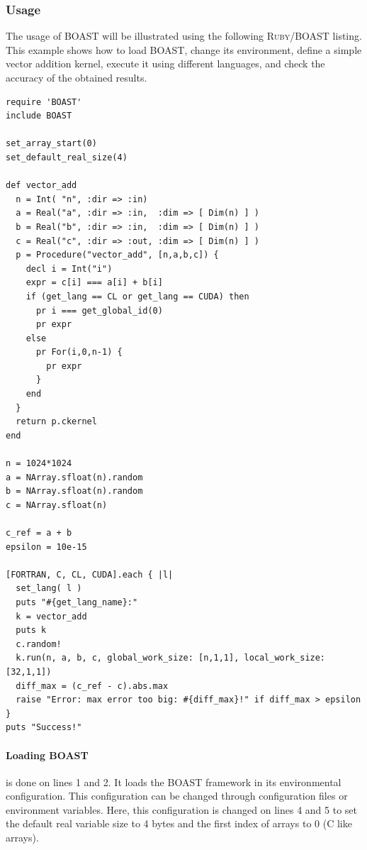 \documentclass[11pt, a4paper, twoside]{montblanc2}
\def\ruby{\textsc{Ruby}\xspace}
\begin{document}
\subsubsection{Usage}


The usage of BOAST will be illustrated using the following \ruby/BOAST listing.
This example shows how to load BOAST, change its environment, define a simple vector addition kernel, execute it using different languages, and check the accuracy of the obtained results.

\lstset{style=BOAST}
\begin{lstlisting}
require 'BOAST'
include BOAST

set_array_start(0)
set_default_real_size(4)

def vector_add
  n = Int( "n", :dir => :in)
  a = Real("a", :dir => :in,  :dim => [ Dim(n) ] )
  b = Real("b", :dir => :in,  :dim => [ Dim(n) ] )
  c = Real("c", :dir => :out, :dim => [ Dim(n) ] )
  p = Procedure("vector_add", [n,a,b,c]) {
    decl i = Int("i")
    expr = c[i] === a[i] + b[i]
    if (get_lang == CL or get_lang == CUDA) then
      pr i === get_global_id(0)
      pr expr
    else
      pr For(i,0,n-1) {
        pr expr
      }
    end
  }
  return p.ckernel
end

n = 1024*1024
a = NArray.sfloat(n).random
b = NArray.sfloat(n).random
c = NArray.sfloat(n)

c_ref = a + b
epsilon = 10e-15

[FORTRAN, C, CL, CUDA].each { |l|
  set_lang( l )
  puts "#{get_lang_name}:"
  k = vector_add
  puts k
  c.random!
  k.run(n, a, b, c, global_work_size: [n,1,1], local_work_size: [32,1,1])
  diff_max = (c_ref - c).abs.max
  raise "Error: max error too big: #{diff_max}!" if diff_max > epsilon
}
puts "Success!"
\end{lstlisting}

\paragraph{Loading BOAST} is done on lines 1 and 2.
It loads the BOAST framework in its environmental configuration.
This configuration can be changed through configuration files or environment variables.
Here, this configuration is changed on lines 4 and 5 to set the default real variable size to 4 bytes and the first index of arrays to 0 (C like arrays).
\end{document}
